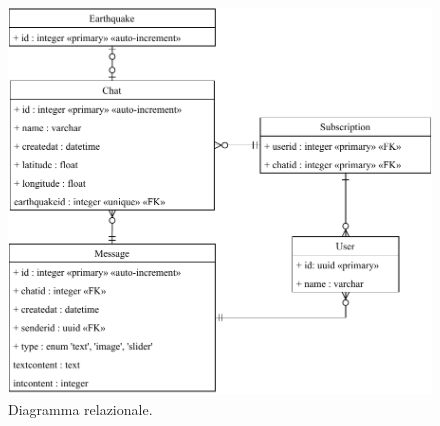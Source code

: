 \begin{figure}[ht!]
\centering
\includegraphics[width=\textwidth]{assets/03/relazionale.pdf}
\caption{Diagramma relazionale.}
\label{fig:diagramma_relazionale}
\end{figure}

